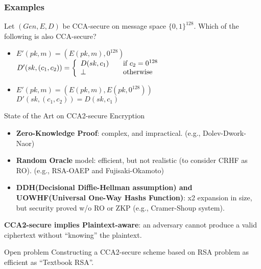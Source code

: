\begin{frame}\frametitle{Examples}
\begin{exampleblock}{Let $(Gen, E, D)$ be CCA-secure on message space $\{0, 1\}^{128}$. Which of the following is also CCA-secure?}
\begin{itemize}
\item $E'(pk, m) = (E(pk, m), 0^{128})$\\
$D'(sk, (c_{1}, c_{2})) = \left\{ 
  \begin{array}{l l}
    D(sk, c_{1}) & \quad \text{if}\ c_{2} = 0^{128}\\
    \bot &  \quad \text{otherwise}\\
  \end{array} \right. $
\item $E'(pk, m)= (E(pk, m), E(pk, 0^{128}))$\\
$D'(sk, (c_{1}, c_{2})) = D(sk, c_{1})$
\end{itemize}
\end{exampleblock}
\end{frame}
\begin{frame}{State of the Art on CCA2-secure Encryption}
\begin{itemize}
\item \textbf{Zero-Knowledge Proof}: complex, and impractical. (e.g., Dolev-Dwork-Naor)
\item \textbf{Random Oracle} model: efficient, but not realistic (to consider CRHF as RO). (e.g., RSA-OAEP and Fujisaki-Okamoto)
\item \textbf{DDH(Decisional Diffie-Hellman assumption) and UOWHF(Universal One-Way Hashs Function)}: x2 expansion in size, but security proved w/o RO or ZKP (e.g., Cramer-Shoup system).
\end{itemize}
\textbf{CCA2-secure implies Plaintext-aware}: an adversary cannot produce a valid ciphertext without ``knowing'' the plaintext.
\begin{block}{Open problem}
Constructing a CCA2-secure scheme based on RSA problem as efficient as ``Textbook RSA''.
\end{block}
\end{frame}
